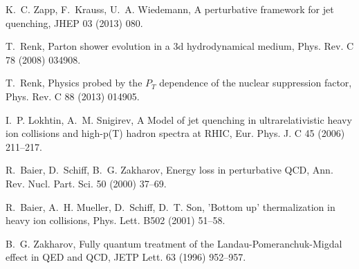 \documentclass[preprint,12pt]{elsarticle}
\begin{document}
\begin{thebibliography}{99}
K.~C. Zapp, F.~Krauss, U.~A. Wiedemann, {A perturbative framework for jet
  quenching}, JHEP 03 (2013) 080.
{}

T.~Renk,%
{Parton
  shower evolution in a 3d hydrodynamical medium}, Phys. Rev. C 78 (2008)
  034908.
{}

T.~Renk, %
{Physics
  probed by the ${P}_{T}$ dependence of the nuclear suppression factor}, Phys.
  Rev. C 88 (2013) 014905.
{}

I.~P. Lokhtin, A.~M. Snigirev, {A Model of jet quenching in ultrarelativistic
  heavy ion collisions and high-p(T) hadron spectra at RHIC}, Eur. Phys. J. C
  45 (2006) 211--217.
  {}

R.~Baier, D.~Schiff, B.~G. Zakharov, {Energy loss in perturbative QCD}, Ann.
  Rev. Nucl. Part. Sci. 50 (2000) 37--69.
  {} %

R.~Baier, A.~H. Mueller, D.~Schiff, D.~T. Son, {'Bottom up' thermalization in
  heavy ion collisions}, Phys. Lett. B502 (2001) 51--58.
  {}%

B.~G. Zakharov, {Fully quantum treatment of the Landau-Pomeranchuk-Migdal
  effect in QED and QCD}, JETP Lett. 63 (1996) 952--957.
  {}%


\end{thebibliography}
\end{document}
